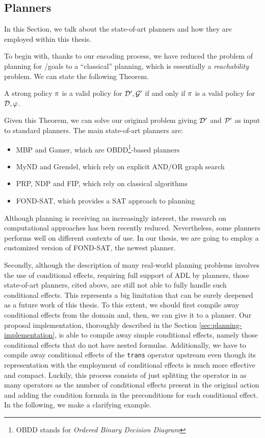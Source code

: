 \subsection{\FOND Planners}
In this Section, we talk about the state-of-art \FOND planners and how they are employed within this thesis.

To begin with, thanks to our encoding process, we have reduced the problem of \FOND planning for \LTLf/\PLTL goals to a ``classical'' \FOND planning, which is essentially a \textit{reachability} problem. We can state the following Theorem.

\begin{theorem}
A strong policy $\trace$ is a valid policy for $\D', \G'$ if and only if $\trace$ is a valid policy for $\D,\varphi$.
\end{theorem}

Given this Theorem, we can solve our original problem giving $\D'$ and $\P'$ as input to standard \FOND planners. The main state-of-art \FOND planners are:
\begin{itemize}
\item MBP and Gamer, which are OBDD\footnote{OBDD stands for \textit{Ordered Binary Decision Diagram}}-based planners \citep{cimatti2003weak, kissmann2009solving}
\item MyND and Grendel, which rely on explicit AND/OR graph search \citep{bercher2010pattern, ramirez2014directed}
\item PRP, NDP and FIP, which rely on classical algorithms \citep{kuter2008using, fu2011simple, muise2012improved}
\item FOND-SAT, which provides a SAT approach to \FOND planning \citep{geffner2018compact}
\end{itemize}
Although \FOND planning is receiving an increasingly interest, the research on computational approaches has been recently reduced. Nevertheless, some planners performs well on different contexts of use. In our thesis, we are going to employ a customized version of FOND-SAT, the newest planner.

Secondly, although the description of many real-world planning problems involves the use of conditional effects, requiring full support of ADL by planners, those state-of-art planners, cited above, are still not able to fully handle such conditional effects. This represents a big limitation that can be surely deepened as a future work of this thesis. To this extent, we should first compile away conditional effects from the domain and, then, we can give it to a planner. Our proposal implementation, thoroughly described in the Section \ref{sec:planning-implementation}, is able to compile away simple conditional effects, namely those conditional effects that do not have nested formulas. Additionally, we have to  compile away conditional effects of the \texttt{trans} operator upstream even though its  representation with the employment of conditional effects is much more effective and compact. Luckily, this process consists of just splitting the operator in as many operators as the number of conditional effects present in the original action and adding the condition formula in the preconditions for each conditional effect. In the following, we make a clarifying example.

